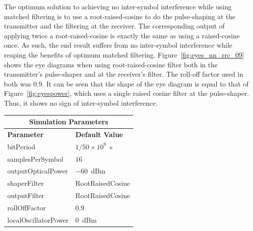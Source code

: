 The optimum solution to achieving no inter-symbol interference while using
matched filtering is to use a root-raised-cosine to do the pulse-shaping at the
transmitter and the filtering at the receiver. The corresponding output of
applying twice a root-raised-cosine is exactly the same as using a
raised-cosine once. As such, the end result suffers from no inter-symbol
interference while reaping the benefits of optimum matched filtering.
Figure~\ref{fig:eyes_nn_rrc_09} shows the eye diagrams when using
root-raised-cosine filter both in the transmitter's pulse-shaper and at the
receiver's filter. The roll-off factor used in both was 0.9. It can be seen
that the shape of the eye diagram is equal to that of
Figure~\ref{fig:eyespower}, which uses a single raised cosine filter at the
pulse-shaper. Thus, it shows no sign of inter-symbol interference.
\begin{table}[H]
	\centering
	\footnotesize
	\begin{tabular}{|l|l|}
		\hline
		\multicolumn{2}{|c|}{ \textbf{Simulation Parameters} } \\
		\hline
		\textbf{Parameter}     & \textbf{Default Value}                                     \\\hline
		bitPeriod              & $1/50\times10^9$~s														\\\hline
		samplesPerSymbol       & $16$                                                       \\\hline
		outputOpticalPower     & $-60$~dBm 													\\ \hline
		shaperFilter	       & RootRaisedCosine												\\ \hline
		outputFilter		   & RootRaisedCosine												\\ \hline
		rollOffFactor		   & 0.9														\\ \hline
		localOscillatorPower   & $0$~dBm                                                    \\ \hline

\end{tabular}
\end{table}
